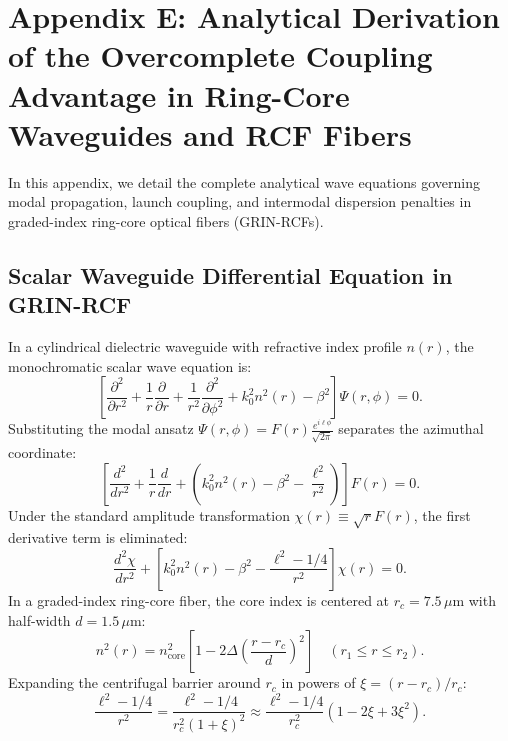 \documentclass{optica-article}
\begin{document}
\section{Appendix E: Analytical Derivation of the Overcomplete Coupling Advantage in Ring-Core Waveguides and RCF Fibers}
\label{app:waveguide}

In this appendix, we detail the complete analytical wave equations governing modal propagation, launch coupling, and intermodal dispersion penalties in graded-index ring-core optical fibers (GRIN-RCFs).

\subsection{Scalar Waveguide Differential Equation in GRIN-RCF}

In a cylindrical dielectric waveguide with refractive index profile $n(r)$, the monochromatic scalar wave equation is:
\begin{equation}
\left[ \frac{\partial^2}{\partial r^2} + \frac{1}{r} \frac{\partial}{\partial r} + \frac{1}{r^2} \frac{\partial^2}{\partial \phi^2} + k_0^2 n^2(r) - \beta^2 \right] \Psi(r, \phi) = 0.
\label{eq:app_scalar_helmholtz}
\end{equation}
Substituting the modal ansatz $\Psi(r, \phi) = F(r) \frac{e^{i \ell \phi}}{\sqrt{2\pi}}$ separates the azimuthal coordinate:
\begin{equation}
\left[ \frac{d^2}{dr^2} + \frac{1}{r} \frac{d}{dr} + \left( k_0^2 n^2(r) - \beta^2 - \frac{\ell^2}{r^2} \right) \right] F(r) = 0.
\label{eq:app_radial_ode}
\end{equation}
Under the standard amplitude transformation $\chi(r) \equiv \sqrt{r} F(r)$, the first derivative term is eliminated:
\begin{equation}
\frac{d^2 \chi}{dr^2} + \left[ k_0^2 n^2(r) - \beta^2 - \frac{\ell^2 - 1/4}{r^2} \right] \chi(r) = 0.
\label{eq:app_chi_ode}
\end{equation}
In a graded-index ring-core fiber, the core index is centered at $r_c = 7.5\,\mu\text{m}$ with half-width $d = 1.5\,\mu\text{m}$:
\begin{equation}
n^2(r) = n_{\text{core}}^2 \left[ 1 - 2\Delta \left( \frac{r - r_c}{d} \right)^2 \right] \quad (r_1 \le r \le r_2).
\label{eq:app_n2_core}
\end{equation}
Expanding the centrifugal barrier around $r_c$ in powers of $\xi = (r - r_c) / r_c$:
\begin{equation}
\frac{\ell^2 - 1/4}{r^2} = \frac{\ell^2 - 1/4}{r_c^2 (1 + \xi)^2} \approx \frac{\ell^2 - 1/4}{r_c^2} \left( 1 - 2\xi + 3\xi^2 \right).
\label{eq:app_centrifugal_taylor}
\end{equation}
\end{document}

